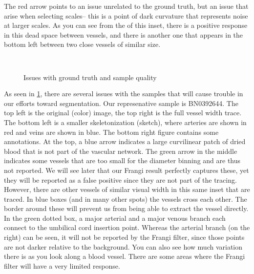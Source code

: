 The red arrow points to an issue unrelated to the ground truth, but an issue that arise when selecting scales-- this is a point of dark curvature that represents noise at larger scales. As you can see from the \Vmax of this inset, there is a positive response in this dead space between vessels, and there is another one that appears in the bottom left between two close vessels of similar size. 

\begin{figure} \centering
 \\
\caption{Issues with ground truth and sample quality}
\label{fig:groundtruth-samplequality}
\end{figure}

As seen in \cref{fig:groundtruth-samplequality}, there are several issues with the samples that will cause trouble in our efforts toward segmentation. Our represenative sample is BN0392644. The top left is the original (color) image, the top right is the full vessel width trace. The bottom left is a smaller skeletonization (sketch), where arteries are shown in red and veins are shown in blue. The bottom right figure contains some annotations. At the top, a blue arrow indicates a large curvilinear patch of dried blood that is not part of the vascular network. The green arrow in the middle indicates some vessels that are too small for the diameter binning and are thus not reported. We will see later that our Frangi result perfectly captures these, yet they will be reported as a false positive since they are not part of the tracing. However, there are other vessels of similar visual width in this same inset that are traced. In blue boxes (and in many other spots) the vessels cross each other. The border around these will prevent us from being able to extract the vessel directly. In the green dotted box, a major arterial and a major venous branch each connect to the umbilical cord insertion point. Whereas the arterial branch (on the right) can be seen, it will not be reported by the Frangi filter, since those points are not darker relative to the background. You can also see how much variation there is as you look along a blood vessel. There are some areas where the Frangi filter will have a very limited response. 



